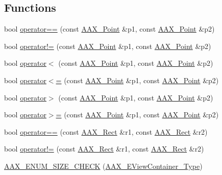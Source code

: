 \subsection*{Functions}
\begin{DoxyCompactItemize}
\item 
bool \mbox{\hyperlink{a00503_a899f910710cb6ccc0a7558221b6662a2}{operator==}} (const \mbox{\hyperlink{a01609}{A\+A\+X\+\_\+\+Point}} \&p1, const \mbox{\hyperlink{a01609}{A\+A\+X\+\_\+\+Point}} \&p2)
\item 
bool \mbox{\hyperlink{a00503_a0eb2e452ed0865872e0f0862dee6ca29}{operator!=}} (const \mbox{\hyperlink{a01609}{A\+A\+X\+\_\+\+Point}} \&p1, const \mbox{\hyperlink{a01609}{A\+A\+X\+\_\+\+Point}} \&p2)
\item 
bool \mbox{\hyperlink{a00503_acf1fd6c19f55dafdee37e5ba34b24833}{operator$<$}} (const \mbox{\hyperlink{a01609}{A\+A\+X\+\_\+\+Point}} \&p1, const \mbox{\hyperlink{a01609}{A\+A\+X\+\_\+\+Point}} \&p2)
\item 
bool \mbox{\hyperlink{a00503_a3e748786f6aec65c75791b067f5158d3}{operator$<$=}} (const \mbox{\hyperlink{a01609}{A\+A\+X\+\_\+\+Point}} \&p1, const \mbox{\hyperlink{a01609}{A\+A\+X\+\_\+\+Point}} \&p2)
\item 
bool \mbox{\hyperlink{a00503_adc56c3178fe78676f64e658930a66afb}{operator$>$}} (const \mbox{\hyperlink{a01609}{A\+A\+X\+\_\+\+Point}} \&p1, const \mbox{\hyperlink{a01609}{A\+A\+X\+\_\+\+Point}} \&p2)
\item 
bool \mbox{\hyperlink{a00503_aab8ccb30f5a16c24a5364804fb28478c}{operator$>$=}} (const \mbox{\hyperlink{a01609}{A\+A\+X\+\_\+\+Point}} \&p1, const \mbox{\hyperlink{a01609}{A\+A\+X\+\_\+\+Point}} \&p2)
\item 
bool \mbox{\hyperlink{a00503_a94c3ae4ba9ec60e0ccb85c6b565908db}{operator==}} (const \mbox{\hyperlink{a01613}{A\+A\+X\+\_\+\+Rect}} \&r1, const \mbox{\hyperlink{a01613}{A\+A\+X\+\_\+\+Rect}} \&r2)
\item 
bool \mbox{\hyperlink{a00503_af834f4e14c1f9e811efa1921a520fdcb}{operator!=}} (const \mbox{\hyperlink{a01613}{A\+A\+X\+\_\+\+Rect}} \&r1, const \mbox{\hyperlink{a01613}{A\+A\+X\+\_\+\+Rect}} \&r2)
\item 
\mbox{\hyperlink{a00503_a58a6a1f6c9c669ba3cbd788d290f1109}{A\+A\+X\+\_\+\+E\+N\+U\+M\+\_\+\+S\+I\+Z\+E\+\_\+\+C\+H\+E\+CK}} (\mbox{\hyperlink{a00503_a89d5cb8c7fdb11f34e695fb0e057b764}{A\+A\+X\+\_\+\+E\+View\+Container\+\_\+\+Type}})
\end{DoxyCompactItemize}


